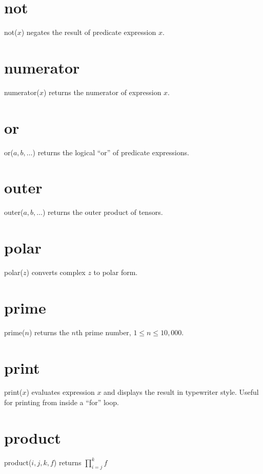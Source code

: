 \documentclass[12pt]{book}
\begin{document}
\section*{not}
not($x$) negates the result of predicate expression $x$.

\section*{numerator}
numerator($x$) returns the numerator of expression $x$.

\section*{or}
or($a,b,\ldots$) returns the logical ``or'' of predicate expressions.

\section*{outer}
outer($a,b,\ldots$) returns the outer product of tensors.

\section*{polar}
polar($z$) converts complex $z$ to polar form.

\section*{prime}
prime($n$) returns the $n$th prime number, $1\le n\le10{,}000$.

\section*{print}
print($x$) evaluates expression $x$ and displays the result in typewriter style.
Useful for printing from inside a ``for'' loop.

\section*{product}
product($i,j,k,f$) returns $\displaystyle\prod_{i=j}^k f$
\end{document}
